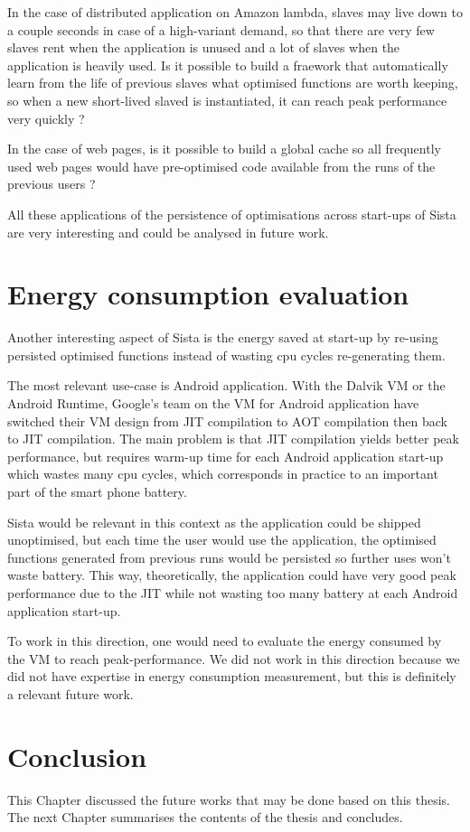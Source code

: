 \documentclass[a4paper,12pt,twoside]{../includes/ThesisStyle}
\begin{document}
In the case of distributed application on Amazon lambda, slaves may live down to a couple seconds in case of a high-variant demand, so that there are very few slaves rent when the application is unused and a lot of slaves when the application is heavily used. Is it possible to build a fraework that automatically learn from the life of previous slaves what optimised functions are worth keeping, so when a new short-lived slaved is instantiated, it can reach peak performance very quickly ?

In the case of web pages, is it possible to build a global cache so all frequently used web pages would have pre-optimised code available from the runs of the previous users ?

All these applications of the persistence of optimisations across start-ups of Sista are very interesting and could be analysed in future work.

\section{Energy consumption evaluation}
\label{sec:energy}

Another interesting aspect of Sista is the energy saved at start-up by re-using persisted optimised functions instead of wasting cpu cycles re-generating them. 

The most relevant use-case is Android application. With the Dalvik VM or the Android Runtime, Google's team on the VM for Android application have switched their VM design from JIT compilation to AOT compilation then back to JIT compilation. The main problem is that JIT compilation yields better peak performance, but requires warm-up time for each Android application start-up which wastes many cpu cycles, which corresponds in practice to an important part of the smart phone battery.

Sista would be relevant in this context as the application could be shipped unoptimised, but each time the user would use the application, the optimised functions generated from previous runs would be persisted so further uses won't waste battery. This way, theoretically, the application could have very good peak performance due to the JIT while not wasting too many battery at each Android application start-up.

To work in this direction, one would need to evaluate the energy consumed by the VM to reach peak-performance. We did not work in this direction because we did not have expertise in energy consumption measurement, but this is definitely a relevant future work.

\section*{Conclusion}

This Chapter discussed the future works that may be done based on this thesis. The next Chapter summarises the contents of the thesis and concludes.

\ifx\wholebook\relax\else
    
\end{document}
